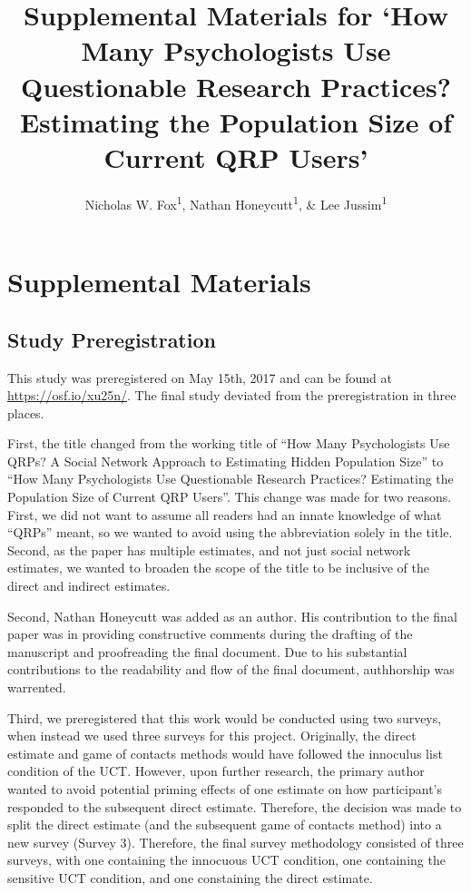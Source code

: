 \documentclass[man]{apa6}
\title{Supplemental Materials for `How Many Psychologists Use Questionable
Research Practices? Estimating the Population Size of Current QRP Users'}
\author{Nicholas W. Fox\textsuperscript{1}, Nathan Honeycutt\textsuperscript{1},
\& Lee Jussim\textsuperscript{1}}
\date{}
\affiliation{
\vspace{0.5cm}
\textsuperscript{1} Rutgers University}
\theoremstyle{definition}
\theoremstyle{definition}
\theoremstyle{definition}
\theoremstyle{remark}
\begin{document}
\maketitle

\section{Supplemental Materials}\label{supplemental-materials}

\subsection{Study Preregistration}\label{study-preregistration}

This study was preregistered on May 15th, 2017 and can be found at
\url{https://osf.io/xu25n/}. The final study deviated from the
preregistration in three places.

First, the title changed from the working title of \enquote{How Many
Psychologists Use QRPs? A Social Network Approach to Estimating Hidden
Population Size} to \enquote{How Many Psychologists Use Questionable
Research Practices? Estimating the Population Size of Current QRP
Users}. This change was made for two reasons. First, we did not want to
assume all readers had an innate knowledge of what \enquote{QRPs} meant,
so we wanted to avoid using the abbreviation solely in the title.
Second, as the paper has multiple estimates, and not just social network
estimates, we wanted to broaden the scope of the title to be inclusive
of the direct and indirect estimates.

Second, Nathan Honeycutt was added as an author. His contribution to the
final paper was in providing constructive comments during the drafting
of the manuscript and proofreading the final document. Due to his
substantial contributions to the readability and flow of the final
document, authhorship was warrented.

Third, we preregistered that this work would be conducted using two
surveys, when instead we used three surveys for this project.
Originally, the direct estimate and game of contacts methods would have
followed the innoculus list condition of the UCT. However, upon further
research, the primary author wanted to avoid potential priming effects
of one estimate on how participant's responded to the subsequent direct
estimate. Therefore, the decision was made to split the direct estimate
(and the subsequent game of contacts method) into a new survey (Survey
3). Therefore, the final survey methodology consisted of three surveys,
with one containing the innocuous UCT condition, one containing the
sensitive UCT condition, and one constaining the direct estimate.
\end{document}
